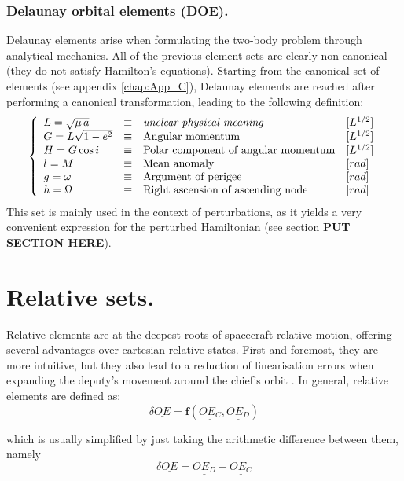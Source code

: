 	\subsubsection{Delaunay orbital elements (DOE).}
	\indent Delaunay elements arise when formulating the two-body problem through analytical mechanics. All of the previous element sets are clearly non-canonical (\ie they do not satisfy Hamilton's equations). Starting from the canonical set of elements (see appendix \ref{chap:App_C}), Delaunay elements are reached after performing a canonical transformation, leading to the following definition:
	\begin{equation}
	\left\{ 
	\begin{array}{llll}
	L = \sqrt{\mu \, a} & \equiv & \text{\textit{unclear physical meaning}} & [L^{1/2}]\\
	G = L \sqrt{1 - e^2}  & \equiv & \text{Angular momentum} & [L^{1/2}]\\
	H = G \cos i  &  \equiv & \text{Polar component of angular momentum} & [L^{1/2}]\\
	l = M & \equiv & \text{Mean anomaly} & [rad]\\
	g = \omega & \equiv & \text{Argument of perigee} & [rad]\\
	h = \Omega & \equiv & \text{Right ascension of ascending node}& [rad]\\
	\end{array}
	\right.
	\end{equation}
	\indent This set is mainly used in the context of perturbations, as it yields a very convenient expression for the perturbed Hamiltonian (see section \textbf{PUT SECTION HERE}). 
%
\section{Relative sets.}
%
\indent Relative elements are at the deepest roots of spacecraft relative motion, offering several advantages over cartesian relative states. First and foremost, they are more intuitive, but they also lead to a reduction of linearisation errors when expanding the deputy's movement around the chief's orbit \cite{Gaias_mean2osc}. In general, relative elements are defined as:
%
\begin{equation}
\delta \underline{OE} = \bm{f} \left( \underline{OE_C}, \underline{OE_D} \right)
\label{eq:	ROE_def}
\end{equation}

%
\noindent which is usually simplified by just taking the arithmetic difference between them, namely
%
\begin{equation}
\delta \underline{OE} = \underline{OE_D} - \underline{OE_C}
\label{eq: OED}
\end{equation}


